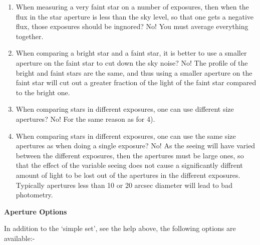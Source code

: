 \begin{small}
{{\begin{enumerate}
\item When measuring a very faint star on a number of exposures,
      then when the flux in the star aperture is less than the
      sky level, so that one gets a negative flux, those exposures
      should be ingnored? No! You must average everything together.
                                                                              
\item When comparing a bright star and a faint star, it is better
      to use a smaller aperture on the faint star to cut down the
      sky noise? No! The profile of the bright and faint stars are
      the same, and thus using a smaller aperture on the faint
      star will cut out a greater fraction of the light of the
      faint star compared to the bright one.
                                                                              
\item When comparing stars in different exposures, one can use
      different size apertures? No! For the same reason as for 4).
                                                                              
\item When comparing stars in different exposures, one can use
      the same size apertures as when doing a single exposure?
      No! As the seeing will have varied between the different
      exposures, then the apertures must be large ones, so that
      the effect of the variable seeing does not cause a
      significantly diffrent amount of light to be lost out of
      the apertures in the different exposures. Typically apertures
      less than 10 or 20 arcsec diameter will lead to bad photometry.
\end{enumerate}      

\vspace*{1mm}
{\bf Aperture Options}
\vspace*{1mm}

 In addition to the `simple set', see the help above, the
  following options are available:-

\hspace*{4ex}\begin{tabular}{|l|l|}  \hline


\end{tabular}}}
\end{small}

